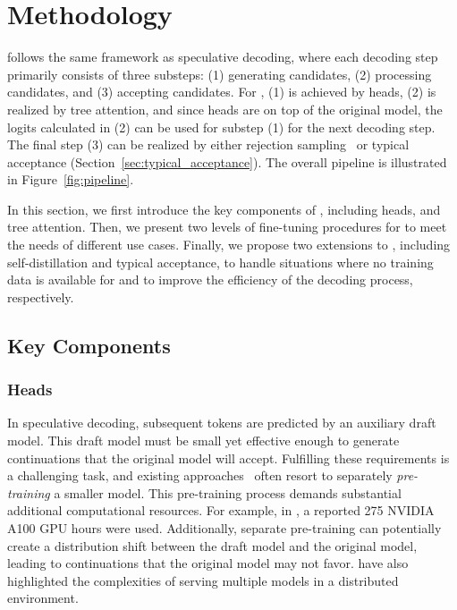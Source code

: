 \section{Methodology}
\ours follows the same framework as speculative decoding, where each decoding step primarily consists of three substeps: (1) generating candidates, (2) processing candidates, and (3) accepting candidates. For \ours, (1) is achieved by \ours heads, (2) is realized by tree attention, and since \ours heads are on top of the original model, the logits calculated in (2) can be used for substep (1) for the next decoding step. The final step (3) can be realized by either rejection sampling~\citep{leviathan2022fast,chen2023accelerating} or typical acceptance (Section~\ref{sec:typical_acceptance}). The overall pipeline is illustrated in Figure~\ref{fig:pipeline}.

In this section, we first introduce the key components of \ours, including \ours heads, and tree attention. Then, we present two levels of fine-tuning procedures for \ours to meet the needs of different use cases. Finally, we propose two extensions to \ours, including self-distillation and typical acceptance, to handle situations where no training data is available for \ours and to improve the efficiency of the decoding process, respectively.
\subsection{Key Components}
\subsubsection{\ours Heads}
\label{sec:medusa_heads}
In speculative decoding, subsequent tokens are predicted by an auxiliary draft model. This draft model must be small yet effective enough to generate continuations that the original model will accept. Fulfilling these requirements is a challenging task, and existing approaches~\citep{spector2023accelerating,miao2023specinfer} often resort to separately \emph{pre-training} a smaller model. This pre-training process demands substantial additional computational resources. For example, in \citep{miao2023specinfer}, a reported 275 NVIDIA A100 GPU hours were used. Additionally, separate pre-training can potentially create a distribution shift between the draft model and the original model, leading to continuations that the original model may not favor. \citet{chen2023accelerating} have also highlighted the complexities of serving multiple models in a distributed environment.

